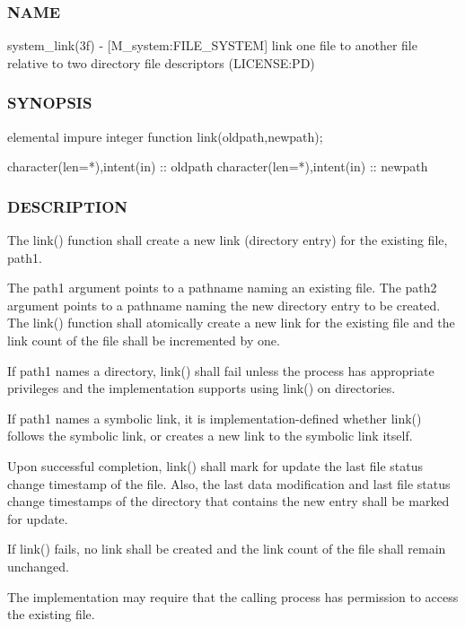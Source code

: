 \subsubsection*{N\+A\+ME}

system\+\_\+link(3f) -\/ \mbox{[}M\+\_\+system\+:F\+I\+L\+E\+\_\+\+S\+Y\+S\+T\+EM\mbox{]} link one file to another file relative to two directory file descriptors (L\+I\+C\+E\+N\+SE\+:PD) 

\subsubsection*{S\+Y\+N\+O\+P\+S\+IS}

\begin{DoxyVerb}elemental impure integer function link(oldpath,newpath);

 character(len=*),intent(in) :: oldpath
 character(len=*),intent(in) :: newpath
\end{DoxyVerb}


\subsubsection*{D\+E\+S\+C\+R\+I\+P\+T\+I\+ON}

The link() function shall create a new link (directory entry) for the existing file, path1.

The path1 argument points to a pathname naming an existing file. The path2 argument points to a pathname naming the new directory entry to be created. The link() function shall atomically create a new link for the existing file and the link count of the file shall be incremented by one.

If path1 names a directory, link() shall fail unless the process has appropriate privileges and the implementation supports using link() on directories.

If path1 names a symbolic link, it is implementation-\/defined whether link() follows the symbolic link, or creates a new link to the symbolic link itself.

Upon successful completion, link() shall mark for update the last file status change timestamp of the file. Also, the last data modification and last file status change timestamps of the directory that contains the new entry shall be marked for update.

If link() fails, no link shall be created and the link count of the file shall remain unchanged.

The implementation may require that the calling process has permission to access the existing file.

